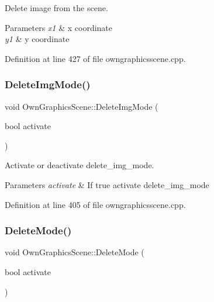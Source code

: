 Delete image from the scene. 


\begin{DoxyParams}{Parameters}
{\em x1} & x coordinate \\
\hline
{\em y1} & y coordinate \\
\hline
\end{DoxyParams}


Definition at line 427 of file owngraphicsscene.\+cpp.

\mbox{\label{classOwnGraphicsScene_aefe52a5b20dbb38dcc9d9510ecfabe52}} 
\subsubsection{\texorpdfstring{Delete\+Img\+Mode()}{DeleteImgMode()}}
{\footnotesize\ttfamily void Own\+Graphics\+Scene\+::\+Delete\+Img\+Mode (\begin{DoxyParamCaption}\item[{bool}]{activate }\end{DoxyParamCaption})}



Activate or deactivate delete\+\_\+img\+\_\+mode. 


\begin{DoxyParams}{Parameters}
{\em activate} & If true activate delete\+\_\+img\+\_\+mode \\
\hline
\end{DoxyParams}


Definition at line 405 of file owngraphicsscene.\+cpp.

\mbox{\label{classOwnGraphicsScene_aca454942ecf6c472d020e063862464d4}} 
\subsubsection{\texorpdfstring{Delete\+Mode()}{DeleteMode()}}
{\footnotesize\ttfamily void Own\+Graphics\+Scene\+::\+Delete\+Mode (\begin{DoxyParamCaption}\item[{bool}]{activate }\end{DoxyParamCaption})}



